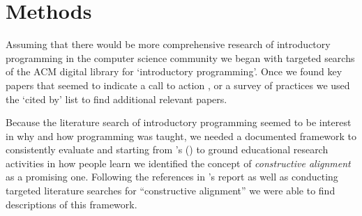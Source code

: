 \documentclass[12pt]{article}
\let\textcite=\autocite
\begin{document}

\section{Methods}
Assuming that there would be more comprehensive research of
introductory programming in the computer science community we began
with targeted searchs of the ACM digital library for `introductory
programming'. Once we found key papers that seemed to indicate a call
to action
\autocite[e.g.][]{mccracken_multinational_2001,kolling_problem_1999},
or a survey of practices
\autocite[e.g.][]{pears_survey_2007-1,robins_learning_2003} we used
the `cited by' list to find additional relevant papers.

Because the literature search of introductory programming seemed to be
interest in why and how programming was taught, we needed a documented
framework to consistently evaluate and starting from
\citeauthor{jamieson_creating_2009}'s
(\citeyear{jamieson_creating_2009}) to ground educational research
activities in how people learn we identified the concept of
\emph{constructive alignment} as a promising one. Following the
references in \citeauthor{jamieson_creating_2009}'s report as well as
conducting targeted literature searches for ``constructive alignment''
we were able to find descriptions of this
framework\autocite{jamieson_creating_2009,pellegrino_rethinking_2006,felder_designing_2003,biggs_enhancing_1996}.


\end{document}
